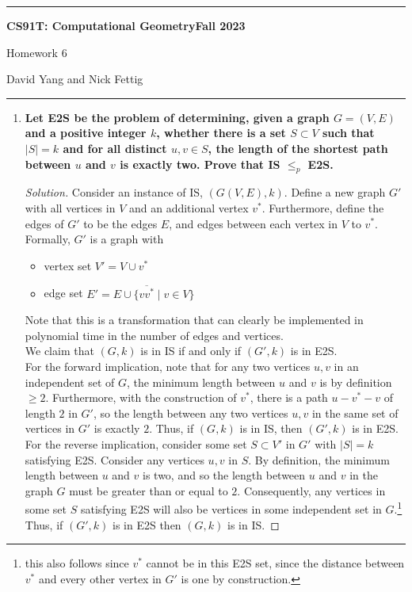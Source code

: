\documentclass[11pt]{article}
\newenvironment{solution}
  {\renewcommand\qedsymbol{$\blacksquare$}\begin{proof}[Solution]}
  {\end{proof}}
\begin{document}
\hrule
\begin{center}
    \textbf{CS91T: Computational Geometry}\hfill \textbf{Fall 2023}\newline

    {\Large Homework 6}

    David Yang and Nick Fettig
\end{center}

\hrule

\vspace{1em}


\begin{enumerate}
\item \textbf{Let E2S be the problem of determining, given a graph $G = (V, E)$ and a positive integer $k$, whether there is a set $S \subset V$ such that $|S| = k$ and for all distinct $u, v \in S$, the length of the shortest path between $u$ and $v$ is exactly two. Prove that IS $\leq_p$ E2S.}

\begin{solution}
Consider an instance of IS, $(G(V, E), k)$. Define a new graph $G'$ with all vertices in $V$ and an additional vertex $v^{\ast}.$ Furthermore, define the edges of $G'$ to be the edges $E$, and edges between each vertex in $V$ to $v^{\ast}$. Formally, $G'$ is a graph with
\begin{itemize}
    \item vertex set $V' = V \cup v^{\ast}$
    \item edge set $E' = E \cup \{\overline{vv^{\ast}} \mid v \in V\}$
\end{itemize}

Note that this is a transformation that can clearly be implemented in polynomial time in the number of edges and vertices.\\

We claim that $(G, k)$ is in IS if and only if $(G', k)$ is in E2S. \\

For the forward implication, note that for any two vertices $u, v$ in an independent set of $G$, the minimum length between $u$ and $v$ is by definition $\geq 2$. Furthermore, with the construction of $v^{\ast}$, there is a path $u-v^{\ast}-v$ of length $2$ in $G'$, so the length between any two vertices $u, v$ in the same set of vertices in $G'$ is exactly $2$. Thus, if $(G, k)$ is in IS, then $(G', k)$ is in E2S. \\

For the reverse implication, consider some set $S \subset V'$ in $G'$ with $|S| = k$ satisfying E2S. Consider any vertices $u, v$ in $S$. By definition, the minimum length between $u$ and $v$ is two, and so the length between $u$ and $v$ in the graph $G$ must be greater than or equal to $2$. Consequently, any vertices in some set $S$ satisfying E2S will also be vertices in some independent set in $G$.\footnote{this also follows since $v^{\ast}$ cannot be in this E2S set, since the distance between $v^{\ast}$ and every other vertex in $G'$ is one by construction.} Thus, if $(G', k)$ is in E2S then $(G, k)$ is in IS.  \end{solution}


\end{enumerate}
\end{document}
